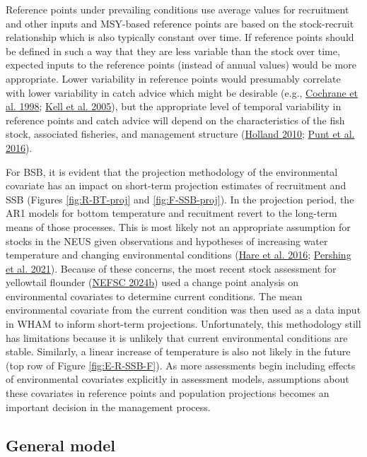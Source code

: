 \documentclass[
]{article}
\begin{document}
Reference points under prevailing conditions use average values for recruitment and other inputs and MSY-based reference points are based on the stock-recruit relationship which is also typically constant over time. If reference points should be defined in such a way that they are less variable than the stock over time, expected inputs to the reference points (instead of annual values) would be more appropriate. Lower variability in reference points would presumably correlate with lower variability in catch advice which might be desirable (e.g., \protect\hyperlink{ref-cochraneetal98}{Cochrane et al. 1998}; \protect\hyperlink{ref-kelletal05}{Kell et al. 2005}), but the appropriate level of temporal variability in reference points and catch advice will depend on the characteristics of the fish stock, associated fisheries, and management structure (\protect\hyperlink{ref-holland10}{Holland 2010}; \protect\hyperlink{ref-puntetal16}{Punt et al. 2016}).

For BSB, it is evident that the projection methodology of the environmental covariate has an impact on short-term projection estimates of recruitment and SSB (Figures \ref{fig:R-BT-proj} and \ref{fig:F-SSB-proj}). In the projection period, the AR1 models for bottom temperature and recuitment revert to the long-term means of those processes. This is most likely not an appropriate assumption for stocks in the NEUS given observations and hypotheses of increasing water temperature and changing environmental conditions (\protect\hyperlink{ref-hareetal16}{Hare et al. 2016}; \protect\hyperlink{ref-pershingetal21}{Pershing et al. 2021}). Because of these concerns, the most recent stock assessment for yellowtail flounder (\protect\hyperlink{ref-nefsc24a}{NEFSC 2024b}) used a change point analysis on environmental covariates to determine current conditions. The mean environmental covariate from the current condition was then used as a data input in WHAM to inform short-term projections. Unfortunately, this methodology still has limitations because it is unlikely that current environmental conditions are stable. Similarly, a linear increase of temperature is also not likely in the future (top row of Figure \ref{fig:E-R-SSB-F}). As more assessments begin including effects of environmental covariates explicitly in assessment models, assumptions about these covariates in reference points and population projections becomes an important decision in the management process.

\hypertarget{general-model}{%
\subsection*{General model}\label{general-model}}
\end{document}

